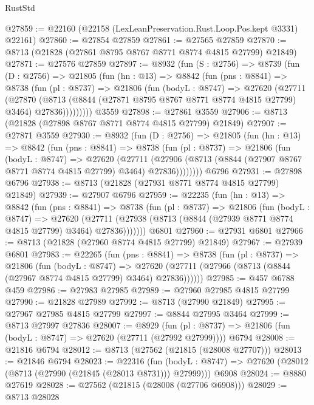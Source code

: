 \begin{lexlean}{RustStd}
\begin{coremodule}
@27859 := @22160 (@22158 (LexLeanPreservation.Rust.Loop.Pos.kept @3331) @22161)
@27860 := @27854 @27859
@27861 := @27565 @27859
@27870 := @8713 (@21828 (@27861 @8795 @8767 @8771 @8774 @4815 @27799) @21849)
@27871 := @27576 @27859
@27897 := @8932
    (fun (S : @2756) =>
    @8739
      (fun (D : @2756) =>
      @21805
        (fun (hn : @13) =>
        @8842
          (fun (pns : @8841) =>
          @8738
            (fun (pl : @8737) =>
            @21806
              (fun (bodyL : @8747) =>
              @27620
                (@27711
                  (@27870
                    (@8713
                      (@8844 (@27871 @8795 @8767 @8771 @8774 @4815 @27799) @3464)
                      @27836)))))))))
    @3559
@27898 := @27861 @3559
@27906 := @8713 (@21828 (@27898 @8767 @8771 @8774 @4815 @27799) @21849)
@27907 := @27871 @3559
@27930 := @8932
    (fun (D : @2756) =>
    @21805
      (fun (hn : @13) =>
      @8842
        (fun (pns : @8841) =>
        @8738
          (fun (pl : @8737) =>
          @21806
            (fun (bodyL : @8747) =>
            @27620
              (@27711
                (@27906 (@8713 (@8844 (@27907 @8767 @8771 @8774 @4815 @27799) @3464) @27836))))))))
    @6796
@27931 := @27898 @6796
@27938 := @8713 (@21828 (@27931 @8771 @8774 @4815 @27799) @21849)
@27939 := @27907 @6796
@27959 := @22235
    (fun (hn : @13) =>
    @8842
      (fun (pns : @8841) =>
      @8738
        (fun (pl : @8737) =>
        @21806
          (fun (bodyL : @8747) =>
          @27620
            (@27711 (@27938 (@8713 (@8844 (@27939 @8771 @8774 @4815 @27799) @3464) @27836)))))))
    @6801
@27960 := @27931 @6801
@27966 := @8713 (@21828 (@27960 @8774 @4815 @27799) @21849)
@27967 := @27939 @6801
@27983 := @22265
    (fun (pns : @8841) =>
    @8738
      (fun (pl : @8737) =>
      @21806
        (fun (bodyL : @8747) =>
        @27620 (@27711 (@27966 (@8713 (@8844 (@27967 @8774 @4815 @27799) @3464) @27836))))))
@27985 := @457 @6788 @459
@27986 := @27983 @27985
@27989 := @27960 @27985 @4815 @27799
@27990 := @21828 @27989
@27992 := @8713 (@27990 @21849)
@27995 := @27967 @27985 @4815 @27799
@27997 := @8844 @27995 @3464
@27999 := @8713 @27997 @27836
@28007 := @8929
    (fun (pl : @8737) => @21806 (fun (bodyL : @8747) => @27620 (@27711 (@27992 @27999))))
    @6794
@28008 := @21816 @6794
@28012 := @8713 (@27562 (@21815 (@28008 @27707)))
@28013 := @21846 @6794
@28023 := @22316
    (fun (bodyL : @8747) => @27620 (@28012 (@8713 (@27990 (@21845 (@28013 @8731))) @27999)))
    @6908
@28024 := @8880 @27619
@28028 := @27562 (@21815 (@28008 (@27706 @6908)))
@28029 := @8713 @28028

\end{coremodule}
\end{lexlean}
